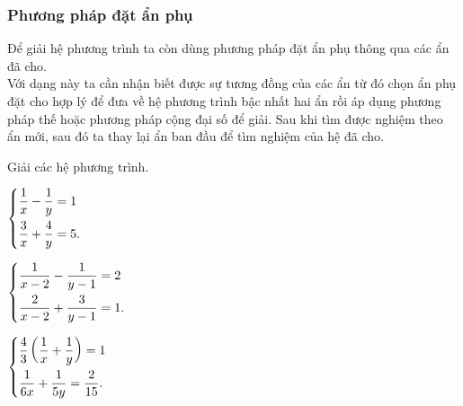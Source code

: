 \subsubsection{Phương pháp đặt ẩn phụ}
Để giải hệ phương trình ta còn dùng phương pháp đặt ẩn phụ thông qua các ẩn đã cho.\\Với dạng này ta cần nhận biết được sự tương đồng của các ẩn từ đó chọn ẩn phụ đặt cho hợp lý để đưa về hệ phương trình bậc nhất hai ẩn rồi áp dụng phương pháp thế hoặc phương pháp cộng đại số để giải. Sau khi tìm được nghiệm theo ẩn mới, sau đó ta thay lại ẩn ban đầu để tìm nghiệm của hệ đã cho. 
\begin{vd}
	Giải các hệ phương trình.
	\begin{enumEX}{3}
		\item $\left\{\begin{aligned}&\dfrac{1}{x}-\dfrac{1}{y}=1\\&\dfrac{3}{x}+\dfrac{4}{y}=5.\end{aligned}\right.$
		\item $\left\{\begin{aligned}&\dfrac{1}{x-2}-\dfrac{1}{y-1}=2\\&\dfrac{2}{x-2}+\dfrac{3}{y-1}=1.\end{aligned}\right.$
		\item $\left\{\begin{aligned}&\dfrac{4}{3}\left(\dfrac{1}{x}+\dfrac{1}{y}\right)=1\\&\dfrac{1}{6x}+\dfrac{1}{5y}=\dfrac{2}{15}.\end{aligned}\right.$
	\end{enumEX}
\end{vd}
